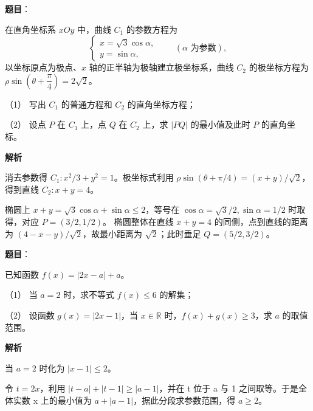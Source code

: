 \begin{answer}

\textbf{题目}：

在直角坐标系 \(xOy\) 中，曲线 \(C_1\) 的参数方程为
\nopagebreak[4]
\[
\begin{cases}
x=\sqrt3\cos\alpha,\\
y=\sin\alpha,
\end{cases}
\qquad(\alpha\text{ 为参数}),
\]
以坐标原点为极点、\(x\) 轴的正半轴为极轴建立极坐标系，曲线 \(C_2\) 的极坐标方程为 \(\rho\sin\left(\theta+\dfrac\pi4\right)=2\sqrt2\)。

（1） 写出 \(C_1\) 的普通方程和 \(C_2\) 的直角坐标方程；

（2） 设点 \(P\) 在 \(C_1\) 上，点 \(Q\) 在 \(C_2\) 上，求 \(|PQ|\) 的最小值及此时 \(P\) 的直角坐标。

\textbf{解析}


消去参数得 \(C_1:x^2/3+y^2=1\)。极坐标式利用 \(\rho\sin(\theta+\pi/4)=(x+y)/\sqrt2\)，得到直线 \(C_2:x+y=4\)。


椭圆上 \(x+y=\sqrt3\cos\alpha+\sin\alpha\leq2\)，等号在 \(\cos\alpha=\sqrt3/2,\sin\alpha=1/2\) 时取得，对应 \(P=(3/2,1/2)\)。
椭圆整体在直线 \(x+y=4\) 的同侧，点到直线的距离为 \((4-x-y)/\sqrt2\)，故最小距离为 \(\sqrt2\)；此时垂足 \(Q=(5/2,3/2)\)。



\end{answer}
\begin{answer}

\textbf{题目}：

已知函数 \(f(x)=|2x-a|+a\)。

（1） 当 \(a=2\) 时，求不等式 \(f(x)\leq6\) 的解集；

（2） 设函数 \(g(x)=|2x-1|\)，当 \(x\in\mathbb R\) 时，\(f(x)+g(x)\geq3\)，求 \(a\) 的取值范围。

\textbf{解析}


当 \(a=2\) 时化为 \(|x-1|\le2\)。


令 \(t=2x\)，利用 \(|t-a|+|t-1|\ge|a-1|\)，并在 t 位于 a 与 1 之间取等。于是全体实数 x 上的最小值为 \(a+|a-1|\)，据此分段求参数范围，得 \(a\ge2\)。



\end{answer}